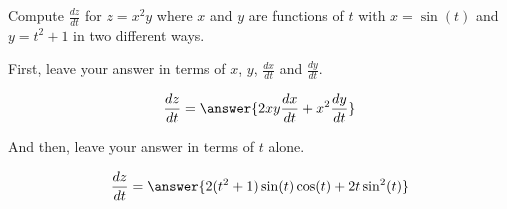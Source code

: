\documentclass{ximera}
\author{David Guichard \and Neal Koblitz \and H. Jerome Keisler \and Albert Scheller \and Barry Balof \and Mike Wills \and Matthew Carr}
\begin{document}
\begin{exercise}




Compute $\frac{dz}{dt}$ for $z=x^2 y$ where $x$ and $y$ are functions of $t$ with $x=\sin(t)$ and $y=t^2+1$ in two different ways.

First, leave your answer in terms of $x$, $y$, $\frac{dx}{dt}$ and $\frac{dy}{dt}$.

\begin{prompt}
\[
\frac{dz}{dt}=\answer{2xy\frac{dx}{dt}+x^2\frac{dy}{dt}}
\]
\end{prompt}

And then, leave your answer in terms of $t$ alone.

\begin{prompt}
\[
\frac{dz}{dt}=\answer{2 (t^2+1) \sin(t) \cos(t)+2t \sin^2(t)}
\]
\end{prompt}


\end{exercise}
\end{document}

